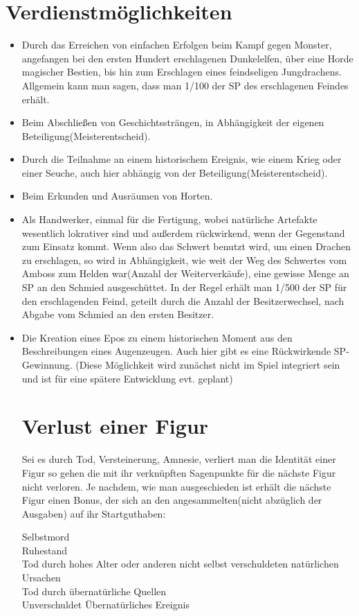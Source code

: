 \documentclass[a4paper,12pt,oneside]{book}
\begin{document}
\section{Verdienstmöglichkeiten}
\begin{itemize}
\item Durch das Erreichen von einfachen Erfolgen beim Kampf gegen Monster, angefangen bei den ersten Hundert erschlagenen Dunkelelfen, über eine Horde magischer Bestien, bis hin zum Erschlagen eines feindseligen Jungdrachens. Allgemein kann man sagen, dass man 1/100 der SP des erschlagenen Feindes erhält.
\item Beim Abschließen von Geschichtssträngen, in Abhängigkeit der eigenen Beteiligung(Meisterentscheid).
\item Durch die Teilnahme an einem historischem Ereignis, wie einem Krieg oder einer Seuche, auch hier abhängig von der Beteiligung(Meisterentscheid).
\item Beim Erkunden und Ausräumen von Horten.
\item Als Handwerker, einmal für die Fertigung, wobei natürliche Artefakte wesentlich lokrativer sind und außerdem rückwirkend, wenn der Gegenstand zum Einsatz kommt. Wenn also das Schwert benutzt wird, um einen Drachen zu erschlagen, so wird in Abhängigkeit, wie weit der Weg des Schwertes vom Amboss zum Helden war(Anzahl der Weiterverkäufe), eine gewisse Menge an SP an den Schmied ausgeschüttet. In der Regel erhält man 1/500 der SP für den erschlagenden Feind, geteilt durch die Anzahl der Besitzerwechsel, nach Abgabe vom Schmied an den ersten Besitzer.
\item Die Kreation eines Epos zu einem historischen Moment aus den Beschreibungen eines Augenzeugen. Auch hier gibt es eine Rückwirkende SP-Gewinnung. (Diese Möglichkeit wird zunächst nicht im Spiel integriert sein und ist für eine spätere Entwicklung evt. geplant)

\section{Verlust einer Figur}
Sei es durch Tod, Versteinerung, Amnesie, verliert man die Identität einer Figur so gehen die mit ihr verknüpften Sagenpunkte für die nächste Figur nicht verloren. Je nachdem, wie man ausgeschieden ist erhält die nächste Figur einen Bonus, der sich an den angesammelten(nicht abzüglich der Ausgaben) auf ihr Startguthaben:
\begin{description}
\item[Selbstmord]
\item[Ruhestand]
\item[Tod durch hohes Alter oder anderen nicht selbst verschuldeten natürlichen Ursachen]
\item[Tod durch übernatürliche Quellen]
\item[Unverschuldet Übernatürliches Ereignis]
\end{description} 

\end{itemize}
\end{document}
